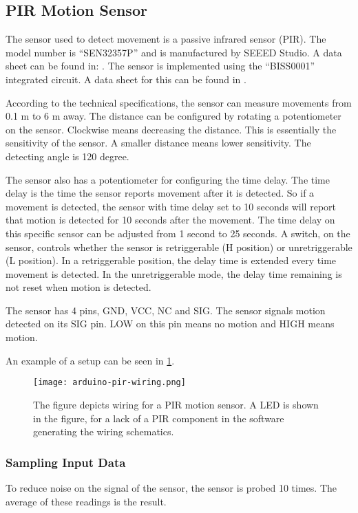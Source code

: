 \subsection{PIR Motion Sensor}\label{sub:pir}

The sensor used to detect movement is a passive infrared sensor (PIR). The model
number is \enquote{SEN32357P} and is manufactured by SEEED Studio. A data sheet
can be found in:
\cite{datasheet_pir1}. The
sensor is implemented using the \enquote{BISS0001} integrated circuit. A data sheet for this can
be found in \cite{datasheet_pir2}.

According to the technical specifications, the sensor can measure movements from 0.1 m to 6 m away. The distance can be configured by rotating a potentiometer on the sensor. Clockwise means decreasing the distance. This is essentially the sensitivity of the sensor. A smaller distance means lower sensitivity. The detecting angle is 120 degree.

The sensor also has a potentiometer for configuring the time delay. The time
delay is the time the sensor reports movement after it is detected. So
if a movement is detected, the sensor with time delay set to 10 seconds will report that motion is detected for 10 seconds after the movement.
The time delay on this specific sensor can be adjusted from 1 second to 25 seconds. A switch, on the sensor, controls whether the sensor is retriggerable (H position) or unretriggerable (L position). In a retriggerable position, the delay time is extended every time movement is detected. In the unretriggerable mode, the delay time remaining is not reset when motion is detected.

The sensor has 4 pins, GND, VCC, NC and SIG. The sensor signals motion detected on its SIG pin. LOW on this pin means no motion and HIGH means motion.

An example of a setup can be seen in \cref{fig:arduino_pir_wiring}.

\begin{figure}[htbp]
  \centering
  \texttt{[image: arduino-pir-wiring.png]}
  \caption[PIR sensor]{The figure depicts wiring for a PIR motion sensor. A LED is shown in
    the figure, for a lack of a PIR component in the software generating the
    wiring schematics.}
  \label{fig:arduino_pir_wiring}
\end{figure}

\subsubsection{Sampling Input Data}
To reduce noise on the signal of the sensor, the sensor is probed 10 times. The average of these readings is the result.